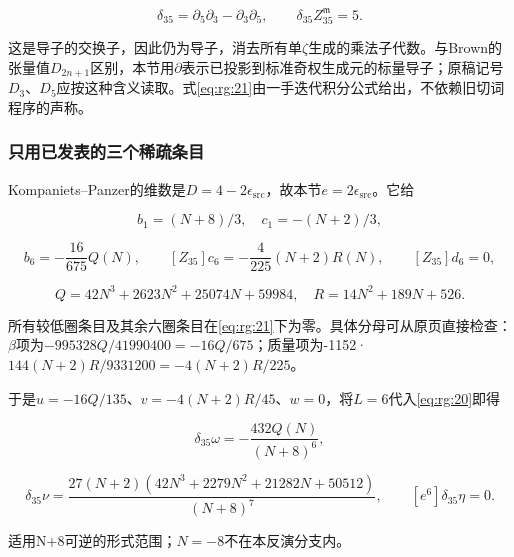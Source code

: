 \documentclass[11pt,a4paper,oneside]{ctexart}
\theoremstyle{cnplain}
\theoremstyle{definition}
\theoremstyle{remark}
\numberwithin{equation}{section}
\begin{document}
\begin{equation}
\delta_{35}=\partial_5\partial_3-\partial_3\partial_5,
 \qquad \delta_{35} Z_{35}^{\mathfrak m}=5.         \label{eq:rg:21}
\end{equation}

这是导子的交换子，因此仍为导子，消去所有单\(\zeta\)生成的乘法子代数。与Brown的张量值\(D_{2n+1}\)区别，本节用\(\partial\)表示已投影到标准奇权生成元的标量导子；原稿记号\(D_3\)、\(D_5\)应按这种含义读取。式\eqref{eq:rg:21}由一手迭代积分公式给出，不依赖旧切词程序的声称。

\subsubsection{只用已发表的三个稀疏条目}\label{sec:rg:7.2}

Kompaniets--Panzer\cite[eqs.(16),(18),(19)]{kp}的维数是\(D=4-2 \epsilon _{\mathrm{src}}\)，故本节\(e=2 \epsilon _{\mathrm{src}}\)。它给

\begin{equation}
b_1=(N+8)/3,\quad c_1=-(N+2)/3,
\end{equation}

\begin{equation}
[Z_{35}]b_6=-\frac{16}{675}Q(N),\qquad
 [Z_{35}]c_6=-\frac4{225}(N+2)R(N),\qquad
 [Z_{35}]d_6=0,
\end{equation}

\begin{equation}
Q=42N^3+2623N^2+25074N+59984,\quad
 R=14N^2+189N+526.                                 \label{eq:rg:22}
\end{equation}

所有较低圈条目及其余六圈条目在\eqref{eq:rg:21}下为零。具体分母可从原页直接检查：\(\beta\)项为\(-995328 Q/41990400=-16Q/675\)；质量项为-1152·\(144(N+2)R/9331200=-4(N+2)R/225\)。

于是\(u=-16Q/135\)、\(v=-4(N+2)R/45\)、\(w=0\)，将\(L=6\)代入\eqref{eq:rg:20}即得

\begin{equation}
[e^6]\delta_{35}\omega=-\frac{432Q(N)}{(N+8)^6},
\end{equation}

\begin{equation}
[e^6]\delta_{35}\nu=
 \frac{27(N+2)(42N^3+2279N^2+21282N+50512)}{(N+8)^7},
 \qquad [e^6]\delta_{35}\eta=0.                    \label{eq:rg:23}
\end{equation}

适用N+8可逆的形式范围；\(N=-8\)不在本反演分支内。
\end{document}

